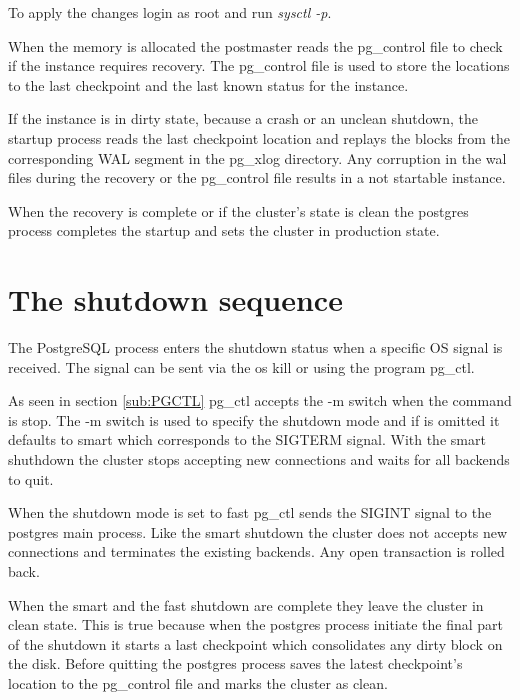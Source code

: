 To apply the changes login as root and run \textit{sysctl -p}.\newline


When the memory is allocated the postmaster reads the pg\_control file to check
if the instance requires recovery. The pg\_control file is used to store the
locations to the last checkpoint and the last known status for the
instance.\newline

If the instance is in dirty state, because a crash or an unclean shutdown, the
startup process reads the last checkpoint location and replays the blocks from
the corresponding WAL segment in the pg\_xlog directory. Any corruption in the
wal files during the recovery or the pg\_control file results in a not
startable instance.\newline

When the recovery is complete or if the cluster's state is clean the postgres
process completes the startup and sets the cluster in production state.

\section{The shutdown sequence}

\label{sec:SHUTDOWN_SEQ}


The PostgreSQL process enters the shutdown status when a specific OS signal is
received. The signal can be sent via the os kill or using the program pg\_ctl.
\newline

As seen in section \ref{sub:PGCTL} pg\_ctl accepts the -m switch when the
command is stop. The -m switch is used to specify the shutdown mode and if is
omitted it defaults to smart which corresponds to the SIGTERM signal. With the
smart shuthdown the cluster stops accepting new connections and waits for all
backends to quit. \newline

When the shutdown mode is set to fast pg\_ctl sends the SIGINT signal to the
postgres main process. Like the smart shutdown the cluster does not accepts new
connections and terminates the existing backends. Any open transaction is
rolled back. \newline

When the smart and the fast shutdown are complete they leave the cluster in
clean state. This is true because when the postgres process initiate the final
part of the shutdown it starts a last checkpoint which consolidates any dirty
block on the disk. Before quitting the postgres process saves the latest
checkpoint's location to the pg\_control file and marks the cluster as
clean.\newline

